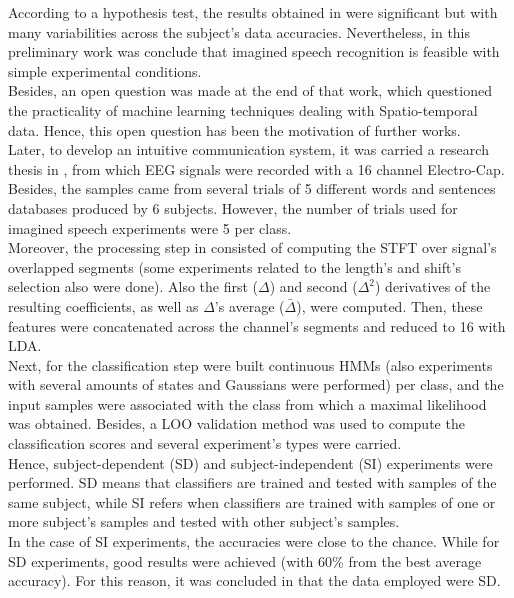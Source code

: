 According to a hypothesis test, the results obtained in \cite{suppes1997brain} were significant but with many variabilities across the subject's data accuracies. Nevertheless, in this \linebreak[4]preliminary work was conclude that imagined speech recognition is feasible with simple experimental conditions.\\

Besides, an open question was made at the end of that work, which questioned the practicality of machine learning techniques dealing with Spatio-temporal data. Hence, this open question has been the motivation of further works.\\

Later, to develop an intuitive communication system, it was carried a research thesis in \cite{marek}, from which EEG signals were recorded with a 16 channel Electro-Cap. Besides, the samples came from several trials of 5 different words and sentences databases produced by 6 subjects. However, the number of trials used for imagined speech experiments were 5 per class.\\

Moreover, the processing step in \cite{marek} consisted of computing the STFT over signal's overlapped segments (some experiments related to the length's and shift's selection also were done). Also the first ($\Delta$) and second ($\Delta^2$) derivatives of the resulting coefficients, as well as $\Delta$'s average ($\bar{\Delta}$), were computed. Then, these features were concatenated across the channel's segments and reduced to 16 with LDA.\\

Next, for the classification step were built continuous HMMs (also experiments with several amounts of states and Gaussians were performed) per class, and the input samples were associated with the class from which a maximal likelihood was obtained. Besides, a LOO validation method was used to compute the classification scores and several experiment's types were carried.\\

Hence, subject-dependent (SD) and subject-independent (SI) experiments were performed. SD means that classifiers are trained and tested with samples of the same subject, while SI refers when classifiers are trained with samples of one or more subject's samples and tested with other subject's samples.\\

In the case of SI experiments, the accuracies were close to the chance. While for SD experiments, good results were achieved (with 60\% from the best average accuracy). For this reason, it was concluded in \cite{marek} that the data employed were SD.\\

